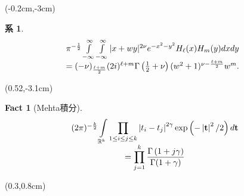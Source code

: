 \documentclass[pdf,notes]{beamer}
\newtheorem*{fact*}{Fact}
\newtheorem{cor}{系}
\begin{document}
\begin{frame}
		\scriptsize
		\setcounter{cor}{0}
	\begin{textblock*}{0.5\textwidth}(-0.2cm,-3cm)
	\begin{cor}\label{cor:int-xzy-hh}
		{\tiny
		\begin{equation*}
			\kern-0.2cm
			\begin{array}[]{c}
				\pi^{-\frac{1}{2}}\int_{- \infty}^{\infty} \int_{- \infty}^{\infty} | x + w y |^{2 \nu} e^{-
			x^2 - y^2} H_\ell (x) H_m (y) d x d y \\= (- \nu)_{\frac{\ell + m}{2}}  (2i)^{\ell + m} \Gamma \left( \frac{1}{2} + \nu \right)
			(w^2 + 1)^{\nu - \frac{\ell + m}{2}} w^m .
			\end{array}
		\end{equation*}
	}
	\end{cor}
	\end{textblock*}
	\begin{textblock*}{0.5\textwidth}(0.52\textwidth,-3.1cm)
		\begin{fact*}[Mehta積分]
			{\tiny
		\begin{equation*}
			\begin{array}[]{c}
			{(2\pi)^{-\frac{k}{2}}}\displaystyle\int_{\mathbb{R}^k}\prod_{1\le i\le j\le k}\myabs{t_i-t_j}^{2\gamma}\exp\left( -\myabs{\mathbf{t}}^2/2 \right)d\mathbf{t}\\
			=\displaystyle\prod_{j=1}^k\frac{\Gamma\left( 
			1+j\gamma\right)}{\Gamma(1+\gamma)}
			\end{array}
		\end{equation*}
	}
		\end{fact*}
	\end{textblock*}
	\begin{textblock*}{0.5\textwidth}(0.3\textwidth,0.8cm)
		\tiny
		\xymatrixcolsep{5pc}
		\xymatrixrowsep{3pc}

\end{textblock*}
\end{frame}
\end{document}
